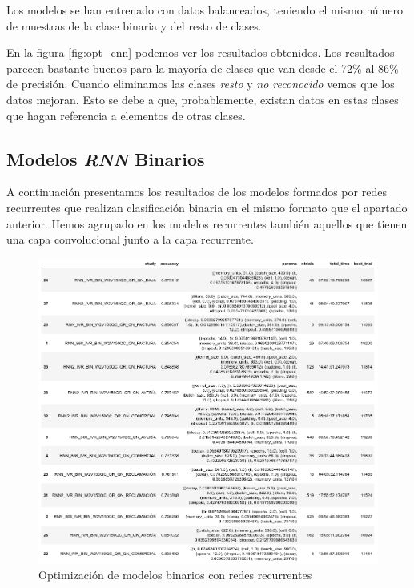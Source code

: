   Los modelos se han entrenado
 con datos balanceados, teniendo el mismo número de muestras de la clase binaria y del resto de
clases. 


En la figura \ref{fig:opt_cnn} podemos ver los resultados obtenidos. Los resultados parecen bastante buenos para la mayoría de clases que van desde el 72\% al 86\% de precisión. Cuando eliminamos las clases \textit{resto} y \textit{no reconocido} vemos que los datos mejoran. Esto se debe a que, probablemente, existan datos en estas clases que hagan referencia a elementos de otras clases.


\subsection{Modelos \textit{RNN} Binarios}

A continuación presentamos los resultados de los modelos formados por redes recurrentes que realizan clasificación binaria en el mismo formato que el apartado anterior. Hemos agrupado en los modelos recurrentes también aquellos que tienen una capa convolucional junto a la capa recurrente. 

\begin{figure}[!ht]
	\centering
	\includegraphics[width=1\textwidth]{images/super/opt_rnn_bin}
	\caption{Optimización de modelos binarios con redes recurrentes}
	\label{fig:opt_rnn}
\end{figure}


